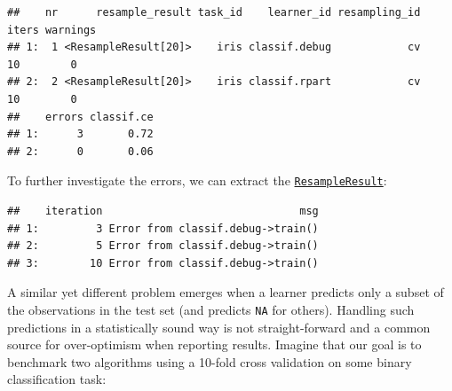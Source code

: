 \documentclass[
]{scrbook}
\newenvironment{Shaded}{\begin{snugshade}}{\end{snugshade}}
\newcommand{\AttributeTok}[1]{\textcolor[rgb]{0.77,0.63,0.00}{#1}}
\newcommand{\ConstantTok}[1]{\textcolor[rgb]{0.00,0.00,0.00}{#1}}
\newcommand{\FloatTok}[1]{\textcolor[rgb]{0.00,0.00,0.81}{#1}}
\newcommand{\FunctionTok}[1]{\textcolor[rgb]{0.00,0.00,0.00}{#1}}
\newcommand{\NormalTok}[1]{#1}
\newcommand{\OtherTok}[1]{\textcolor[rgb]{0.56,0.35,0.01}{#1}}
\newcommand{\SpecialCharTok}[1]{\textcolor[rgb]{0.00,0.00,0.00}{#1}}
\newcommand{\StringTok}[1]{\textcolor[rgb]{0.31,0.60,0.02}{#1}}
\renewenvironment{Shaded} {\begin{snugshade}\small} {\end{snugshade}}
\begin{document}
\begin{Shaded}
\end{Shaded}

\begin{verbatim}
##    nr      resample_result task_id    learner_id resampling_id iters warnings
## 1:  1 <ResampleResult[20]>    iris classif.debug            cv    10        0
## 2:  2 <ResampleResult[20]>    iris classif.rpart            cv    10        0
##    errors classif.ce
## 1:      3       0.72
## 2:      0       0.06
\end{verbatim}

To further investigate the errors, we can extract the \href{https://mlr3.mlr-org.com/reference/ResampleResult.html}{\texttt{ResampleResult}}:

\begin{Shaded}
\end{Shaded}

\begin{verbatim}
##    iteration                               msg
## 1:         3 Error from classif.debug->train()
## 2:         5 Error from classif.debug->train()
## 3:        10 Error from classif.debug->train()
\end{verbatim}

A similar yet different problem emerges when a learner predicts only a subset of the observations in the test set (and predicts \texttt{NA} for others).
Handling such predictions in a statistically sound way is not straight-forward and a common source for over-optimism when reporting results.
Imagine that our goal is to benchmark two algorithms using a 10-fold cross validation on some binary classification task:
\end{document}
